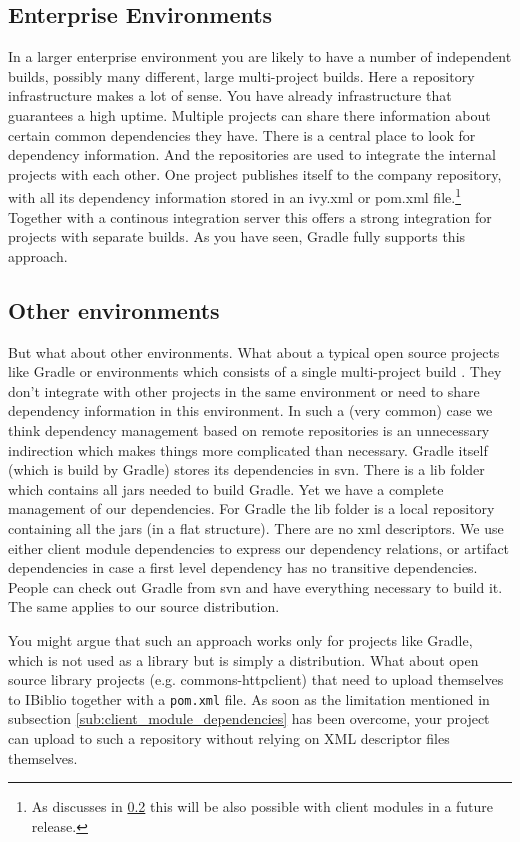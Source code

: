 \subsection{Enterprise Environments} %
\label{sub:enterprise_environments}
In a larger enterprise environment you are likely to have a number of independent builds, possibly many different, large multi-project builds. Here a repository infrastructure makes a lot of sense. You have already infrastructure that guarantees a high uptime. Multiple projects can share there information about certain common dependencies they have. There is a central place to look for dependency information. And the repositories are used to integrate the internal projects with each other. One project publishes itself to the company repository, with all its dependency information stored in an ivy.xml or pom.xml file.\footnote{As discusses in \ref{sub:other_environments} this will be also possible with client modules in a future release.} Together with a continous integration server this offers a strong integration for projects with separate builds. As you have seen, Gradle fully supports this approach.

\subsection{Other environments} %
\label{sub:other_environments}
But what about other environments. What about a typical open source projects like Gradle or environments which consists of a single multi-project build	. They don't integrate with other projects in the same environment or need to share dependency information in this environment. In such a (very common) case we think dependency management based on remote repositories is an unnecessary indirection which makes things more complicated than necessary. Gradle itself (which is build by Gradle) stores its dependencies in svn. There is a lib folder which contains all jars needed to build Gradle. Yet we have a complete management of our dependencies. For Gradle the lib folder is a local repository containing all the jars (in a flat structure). There are no xml descriptors. We use either client module dependencies to express our dependency relations, or artifact dependencies in case a first level dependency has no transitive dependencies. People can check out Gradle from svn and have everything necessary to build it. The same applies to our source distribution. 

You might argue that such an approach works only for projects like Gradle, which is not used as a library but is simply a distribution. What about open source library projects (e.g. commons-httpclient) that need to upload themselves to IBiblio together with a \texttt{pom.xml} file. As soon as the limitation mentioned in subsection \ref{sub:client_module_dependencies} has been overcome, your project can upload to such a repository without relying on XML descriptor files themselves.

